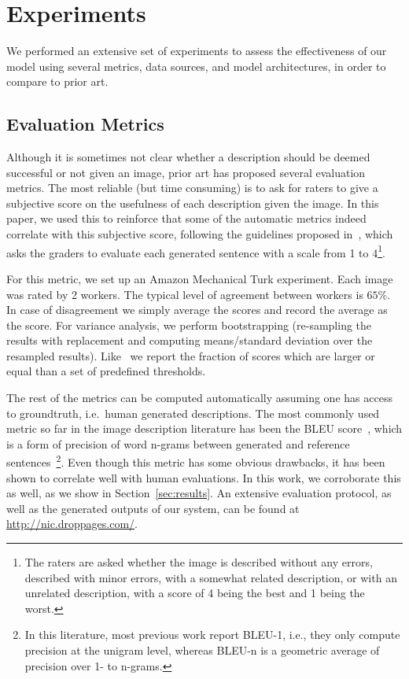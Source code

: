 \section{Experiments}
\label{sec:exps}
We performed an extensive set of experiments to assess the effectiveness of our
model using several metrics, data sources, and model architectures, in order
to compare to prior art.

\subsection{Evaluation Metrics}
Although it is sometimes not clear whether a description should be deemed
successful or not given an image,
prior art has proposed several evaluation metrics. The most
reliable (but time consuming) is to ask for raters to give a subjective score
on the usefulness of each description given the image. In this paper, we used
this to reinforce that some of the automatic metrics indeed correlate with this
subjective score, following the guidelines proposed
in~\cite{hodosh2013framing}, which asks the
graders to evaluate each generated sentence with a scale from 1 to 4\footnote{
The raters are asked whether the image is
described without any errors, described with minor errors, with a somewhat
related description, or with an unrelated description, with a score of 4 being
the best and 1 being the worst.}.

For this metric, we set up an Amazon Mechanical Turk experiment. Each image was
rated by 2 workers. The typical level of agreement between workers
is $65\%$. In case of disagreement we simply average the scores and record the
average as the score. For variance analysis, we perform bootstrapping
(re-sampling the results with replacement and computing means/standard
deviation over the resampled results). Like~\cite{hodosh2013framing} we
report the fraction
of scores which are larger or equal than a set of predefined thresholds.

The rest of the metrics can be computed automatically assuming one has access to
groundtruth, i.e.~human generated descriptions. The most commonly used metric
so far in the image description literature has been the
BLEU score~\cite{papineni2002},
which is a form of precision of word n-grams between generated and reference
sentences~\footnote{In this literature, most previous work report BLEU-1, i.e., they only compute precision at the unigram level, whereas BLEU-n is a geometric average of precision over 1- to n-grams.}.
Even though this metric has some obvious drawbacks, it has been shown to correlate
well with human evaluations. In this work, we corroborate this as well, as
we show in Section~\ref{sec:results}. An extensive evaluation protocol, as well
as the generated outputs of our system, can be found at \url{http://nic.droppages.com/}.

